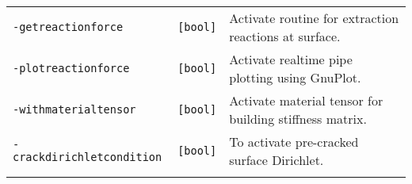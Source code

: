 \begin{longtable}[]{@{}lll@{}}
\begin{minipage}[t]{0.26\columnwidth}\raggedright\strut
\lstinline!-getreactionforce!\strut
\end{minipage} & \begin{minipage}[t]{0.09\columnwidth}\raggedright\strut
\lstinline![bool]!\strut
\end{minipage} & \begin{minipage}[t]{0.56\columnwidth}\raggedright\strut
Activate routine for extraction reactions at surface.\strut
\end{minipage}\tabularnewline
\begin{minipage}[t]{0.26\columnwidth}\raggedright\strut
\lstinline!-plotreactionforce!\strut
\end{minipage} & \begin{minipage}[t]{0.09\columnwidth}\raggedright\strut
\lstinline![bool]!\strut
\end{minipage} & \begin{minipage}[t]{0.56\columnwidth}\raggedright\strut
Activate realtime pipe plotting using GnuPlot.\strut
\end{minipage}\tabularnewline
\begin{minipage}[t]{0.26\columnwidth}\raggedright\strut
\lstinline!-withmaterialtensor!\strut
\end{minipage} & \begin{minipage}[t]{0.09\columnwidth}\raggedright\strut
\lstinline![bool]!\strut
\end{minipage} & \begin{minipage}[t]{0.56\columnwidth}\raggedright\strut
Activate material tensor for building stiffness matrix.\strut
\end{minipage}\tabularnewline
\begin{minipage}[t]{0.26\columnwidth}\raggedright\strut
\lstinline!-crackdirichletcondition!\strut
\end{minipage} & \begin{minipage}[t]{0.09\columnwidth}\raggedright\strut
\lstinline![bool]!\strut
\end{minipage} & \begin{minipage}[t]{0.56\columnwidth}\raggedright\strut
To activate pre-cracked surface Dirichlet.\strut
\end{minipage}\tabularnewline
\begin{minipage}[t]{0.26\columnwidth}\raggedright\strut
\strut
\end{minipage} & \begin{minipage}[t]{0.09\columnwidth}\raggedright\strut

\end{minipage}
\end{longtable}
